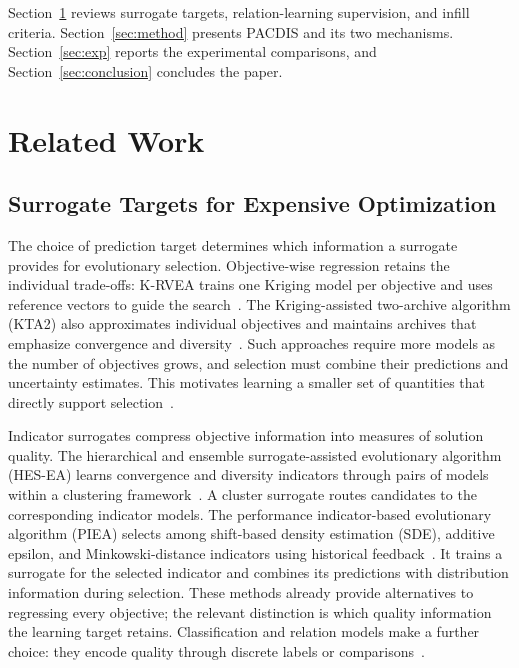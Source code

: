 \documentclass[final,5p,times,twocolumn]{elsarticle}
\begin{document}
Section~\ref{sec:related} reviews surrogate targets, relation-learning
supervision, and infill criteria. Section~\ref{sec:method} presents PACDIS and
its two mechanisms. Section~\ref{sec:exp} reports the experimental comparisons,
and Section~\ref{sec:conclusion} concludes the paper.

\section{Related Work}
\label{sec:related}

\subsection{Surrogate Targets for Expensive Optimization}
\label{sec:related:saea}

The choice of prediction target determines which information a surrogate
provides for evolutionary selection. Objective-wise regression retains the
individual trade-offs: K-RVEA trains one Kriging model per objective and uses
reference vectors to guide the search~\cite{ref:krvea}. The Kriging-assisted
two-archive algorithm (KTA2) also approximates individual objectives and
maintains archives that emphasize convergence and
diversity~\cite{ref:kta2}. Such approaches require more models as the number
of objectives grows, and selection must combine their predictions and
uncertainty estimates. This motivates learning a smaller set of quantities
that directly support selection~\cite{ref:hesea}.

Indicator surrogates compress objective information into measures of solution
quality. The hierarchical and ensemble surrogate-assisted evolutionary
algorithm (HES-EA) learns convergence and diversity indicators through pairs
of models within a clustering framework~\cite{ref:hesea}. A cluster surrogate
routes candidates to the corresponding indicator models. The performance indicator-based
evolutionary algorithm (PIEA) selects among shift-based density estimation
(SDE), additive epsilon, and
Minkowski-distance indicators using historical feedback~\cite{ref:piea}.
It trains a surrogate for the selected indicator and combines its predictions
with distribution information during selection. These methods already provide alternatives to
regressing every objective; the relevant distinction is which quality
information the learning target retains. Classification and relation models
make a further choice: they encode quality through discrete labels or
comparisons~\cite{ref:csea,ref:remo}.
\end{document}
